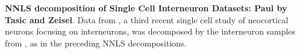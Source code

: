 \textbf{NNLS decomposition of Single Cell Interneuron Datasets: Paul by Tasic and Zeisel}.
Data from \citep{Paul_2017}, a third recent single cell study of neocortical neurons focusing on interneurons, was decomposed by the interneuron samples from \citep{Tasic_2018,Zeisel_2018}, as in the preceding NNLS decompositions. 